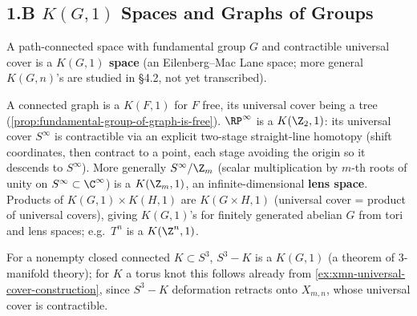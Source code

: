 \subsection{1.B $K(G,1)$ Spaces and Graphs of Groups}
\label{sec:kg1-spaces-graphs-of-groups}

\begin{definition}[$K(G,1)$ space]
\label{def:k-g-1-space}
A path-connected space with fundamental group $G$ and contractible universal
cover is a \textbf{$K(G,1)$ space} (an Eilenberg--Mac Lane space; more general
$K(G,n)$'s are studied in §4.2, not yet transcribed).
\end{definition}

\begin{example}
\label{ex:graphs-are-kg1}
A connected graph is a $K(F,1)$ for $F$ free, its universal cover being a tree
(\cref{prop:fundamental-group-of-graph-is-free}). $\RP^\infty$ is a $K(\Z_2,1)$: its universal
cover $S^\infty$ is contractible via an explicit two-stage straight-line homotopy (shift
coordinates, then contract to a point, each stage avoiding the origin so it descends
to $S^\infty$). More generally $S^\infty/\Z_m$ (scalar multiplication by $m$-th roots of unity
on $S^\infty\subset\C^\infty$) is a $K(\Z_m,1)$, an infinite-dimensional \textbf{lens space}. Products
of $K(G,1)\times K(H,1)$ are $K(G\times H,1)$ (universal cover = product of universal
covers), giving $K(G,1)$'s for finitely generated abelian $G$ from tori and lens
spaces; e.g.\ $T^n$ is a $K(\Z^n,1)$.
\end{example}

\begin{example}
\label{ex:knot-complement-in-s3-kg1}
For a nonempty closed connected $K\subset S^3$, $S^3-K$ is a $K(G,1)$ (a theorem
of 3-manifold theory); for $K$ a torus knot this follows already from
\cref{ex:xmn-universal-cover-construction}, since $S^3-K$ deformation retracts onto
$X_{m,n}$, whose universal cover is contractible.
\end{example}

